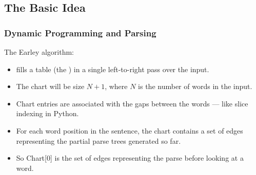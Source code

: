 


\subsection{The Basic Idea}


\begin{frame}[fragile]
  \frametitle{Dynamic Programming and Parsing}


The Earley algorithm:

\begin{itemize}
  
\item fills a table (the ) in a single left-to-right pass
  over the input.
\item The chart will be size $N+1$, where $N$ is the number of words in
  the input.
\item Chart entries are associated with the gaps between the
  words --- like slice indexing in Python.

\item For each word position in the sentence, the chart contains a set
  of edges representing the partial parse trees generated so far.

\item So Chart[0] is the set of edges representing the parse before looking at a word.


\end{itemize}

\end{frame}


